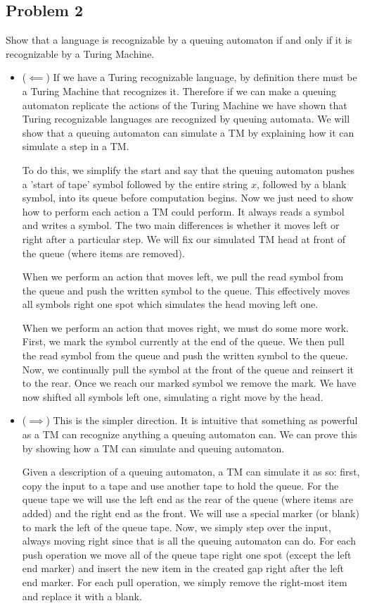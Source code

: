 \documentclass[english]{article}
\begin{document}
\subsection*{Problem 2}
Show that a language is recognizable by a queuing automaton if and only if it
is recognizable by a Turing Machine.
\begin{itemize}
\item ($ \impliedby $) If we have a Turing recognizable language, by
  definition there must be a Turing Machine that recognizes it. Therefore if
  we can make a queuing automaton replicate the actions of the Turing Machine
  we have shown that Turing recognizable languages are recognized by queuing
  automata. We will show that a queuing automaton can simulate a TM by explaining
  how it can simulate a step in a TM.

  To do this, we simplify the start and say that the queuing automaton pushes
  a 'start of tape' symbol followed by the entire string $x$, followed
  by a blank symbol, into its queue before computation begins. Now we just need to
  show how to perform each action a TM could perform. It always reads a symbol and
  writes a symbol. The two main differences is whether it moves left or right after
  a particular step. We will fix our simulated TM head at front of the queue (where
  items are removed).
  
  When we perform an action that moves left, we pull the read symbol from the queue
  and push the written symbol to the queue. This effectively moves all symbols right
  one spot which simulates the head moving left one.
  
  When we perform an action that moves right, we must do some more work. First, we mark the
  symbol currently at the end of the queue. We then pull the read symbol from
  the queue and push the written symbol to the queue. Now, we continually pull the symbol
  at the front of the queue and reinsert it to the rear. Once we reach our marked symbol we
  remove the mark. We have now shifted all symbols left one, simulating a right move by the
  head.
  
\item ($ \implies $) This is the simpler direction. It is intuitive that something as
  powerful as a TM can recognize anything a queuing automaton can. We can prove this
  by showing how a TM can simulate and queuing automaton.
  
  Given a description of a queuing automaton, a TM can simulate it as so: first, copy
  the input to a tape and use another tape to hold the queue. For the queue tape we will
  use the left end as the rear of the queue (where items are added) and the right end as
  the front. We will use a special marker (or blank) to mark the left of the queue tape.
  Now, we simply step over the input, always moving right since that is all
  the queuing automaton can do. For each push operation we move all of the queue tape
  right one spot (except the left end marker) and insert the new item in the created gap right
  after the left end marker. For each pull operation, we simply remove the right-most item
  and replace it with a blank.
  

\end{itemize}
\end{document}
